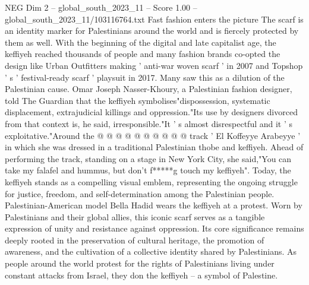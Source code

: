 \begin{textsample}{NEG Dim 2 – global\_south\_2023\_11 – Score 1.00 – global\_south\_2023\_11/103116764.txt}
Fast fashion enters the picture The scarf is an identity marker for Palestinians around the world and is fiercely protected by them as well.
With the beginning of the digital and late capitalist age, the keffiyeh reached thousands of people and many fashion brands co-opted the design like Urban Outfitters making ' anti-war woven scarf ' in 2007 and Topshop ' s ' festival-ready scarf ' playsuit in 2017.
Many saw this as a dilution of the Palestinian cause.
Omar Joseph Nasser-Khoury, a Palestinian fashion designer, told The Guardian that the keffiyeh symbolises"dispossession, systematic displacement, extrajudicial killings and oppression."Its use by designers divorced from that context is, he said, irresponsible."It ' s almost disrespectful and it ' s exploitative."Around the @ @ @ @ @ @ @ @ @ @ track ' El Koffeyye Arabeyye ' in which she was dressed in a traditional Palestinian thobe and keffiyeh.
Ahead of performing the track, standing on a stage in New York City, she said,"You can take my falafel and hummus, but don't f*****g touch my keffiyeh".
Today, the keffiyeh stands as a compelling visual emblem, representing the ongoing struggle for justice, freedom, and self-determination among the Palestinian people.
Palestinian-American model Bella Hadid wears the keffiyeh at a protest.
Worn by Palestinians and their global allies, this iconic scarf serves as a tangible expression of unity and resistance against oppression.
Its core significance remains deeply rooted in the preservation of cultural heritage, the promotion of awareness, and the cultivation of a collective identity shared by Palestinians.
As people around the world protest for the rights of Palestinians living under constant attacks from Israel, they don the keffiyeh -- a symbol of Palestine.

\end{textsample}
